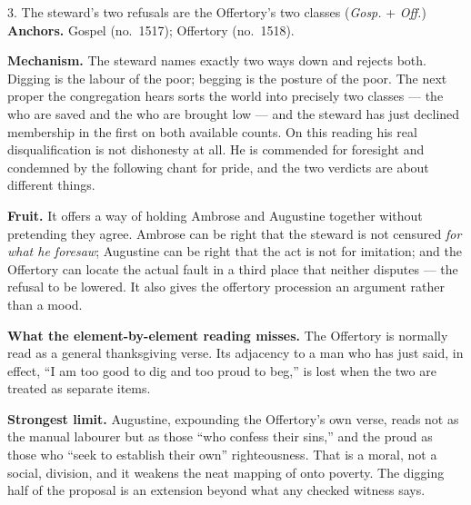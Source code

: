 \begin{proposal}{3. The steward's two refusals are the Offertory's two classes
\normalfont(\emph{Gosp.} + \emph{Off.})}
\textbf{Anchors.} Gospel 
(no.\ 1517); Offertory  (no.\ 1518).

\textbf{Mechanism.} The steward names exactly two ways down and rejects both.
Digging is the labour of the poor; begging is the posture of the poor. The next
proper the congregation hears sorts the world into precisely two classes --- the
 who are saved and the  who are
brought low --- and the steward has just declined membership in the first on
both available counts. On this reading his real disqualification is not
dishonesty at all. He is commended for foresight and condemned by the following
chant for pride, and the two verdicts are about different things.

\textbf{Fruit.} It offers a way of holding Ambrose and Augustine together
without pretending they agree. Ambrose can be right that the steward is not
censured \emph{for what he foresaw}; Augustine can be right that the act is not
for imitation; and the Offertory can locate the actual fault in a third place
that neither disputes --- the refusal to be lowered. It also gives the offertory
procession an argument rather than a mood.

\textbf{What the element-by-element reading misses.} The Offertory is normally
read as a general thanksgiving verse. Its adjacency to a man who has just said,
in effect, ``I am too good to dig and too proud to beg,'' is lost when the two
are treated as separate items.

\textbf{Strongest limit.} Augustine, expounding the Offertory's own verse, reads
 not as the manual labourer but as those ``who confess
their sins,'' and the proud as those who ``seek to establish their own''
righteousness. That is a moral, not a social, division, and it weakens the neat
mapping of  onto poverty. The digging half of the proposal is an
extension beyond what any checked witness says.
\end{proposal}

